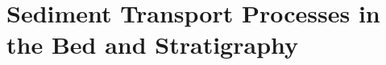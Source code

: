 \chapter[Sediment Transport Processes in the Bed and Stratigraphy]{Sediment Transport Processes in the Bed and Stratigraphy}

